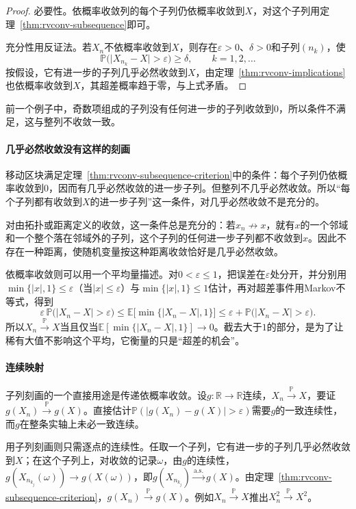 \begin{proof}
必要性。依概率收敛列的每个子列仍依概率收敛到$X$，对这个子列用定理~\ref{thm:rvconv-subsequence}即可。

充分性用反证法。若$X_n$不依概率收敛到$X$，则存在$\varepsilon>0$、$\delta>0$和子列$(n_k)$，使
\[
 \mathbb{P}\bigl(\lvert X_{n_k}-X\rvert>\varepsilon\bigr)\geq\delta,\qquad k=1,2,\dots
\]
按假设，它有进一步的子列几乎必然收敛到$X$，由定理~\ref{thm:rvconv-implications}也依概率收敛到$X$，其超差概率趋于零，与上式矛盾。
\end{proof}

前一个例子中，奇数项组成的子列没有任何进一步的子列收敛到$0$，所以条件不满足，这与整列不收敛一致。

\paragraph{几乎必然收敛没有这样的刻画}
移动区块满足定理~\ref{thm:rvconv-subsequence-criterion}中的条件：每个子列仍依概率收敛到$0$，因而有几乎必然收敛的进一步子列。但整列不几乎必然收敛。所以“每个子列都有收敛到$X$的进一步子列”这一条件，对几乎必然收敛不是充分的。

对由拓扑或距离定义的收敛，这一条件总是充分的：若$x_n\not\to x$，就有$x$的一个邻域和一个整个落在邻域外的子列，这个子列的任何进一步子列都不收敛到$x$。因此不存在一种距离，使随机变量按这种距离收敛恰好是几乎必然收敛。

依概率收敛则可以用一个平均量描述。对$0<\varepsilon\leq1$，把误差在$\varepsilon$处分开，并分别用$\min\{\lvert x\rvert,1\}\leq\varepsilon$（当$\lvert x\rvert\leq\varepsilon$）与$\min\{\lvert x\rvert,1\}\leq1$估计，再对超差事件用Markov不等式，得到
\[
 \varepsilon\,\mathbb{P}\bigl(\lvert X_n-X\rvert>\varepsilon\bigr)\leq\mathbb{E}\bigl[\min\{\lvert X_n-X\rvert,1\}\bigr]\leq\varepsilon+\mathbb{P}\bigl(\lvert X_n-X\rvert>\varepsilon\bigr) .
\]
所以$X_n\xrightarrow{\mathbb{P}}X$当且仅当$\mathbb{E}[\min\{\lvert X_n-X\rvert,1\}]\to0$。截去大于$1$的部分，是为了让稀有大值不影响这个平均，它衡量的只是“超差的机会”。

\paragraph{连续映射}
子列刻画的一个直接用途是传递依概率收敛。设$g:\mathbb{R}\to\mathbb{R}$连续，$X_n\xrightarrow{\mathbb{P}}X$，要证$g(X_n)\xrightarrow{\mathbb{P}}g(X)$。直接估计$\mathbb{P}(\lvert g(X_n)-g(X)\rvert>\varepsilon)$需要$g$的一致连续性，而$g$在整条实轴上未必一致连续。

用子列刻画则只需逐点的连续性。任取一个子列，它有进一步的子列几乎必然收敛到$X$；在这个子列上，对收敛的记录$\omega$，由$g$的连续性，$g(X_{n_{k_j}}(\omega))\to g(X(\omega))$，即$g(X_{n_{k_j}})\xrightarrow{\mathrm{a.s.}}g(X)$。由定理~\ref{thm:rvconv-subsequence-criterion}，$g(X_n)\xrightarrow{\mathbb{P}}g(X)$。例如$X_n\xrightarrow{\mathbb{P}}X$推出$X_n^{2}\xrightarrow{\mathbb{P}}X^{2}$。
